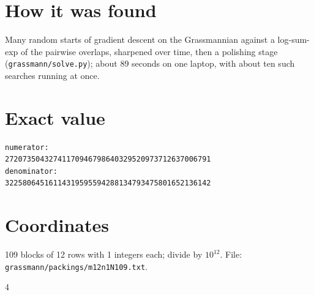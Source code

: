 \documentclass[11pt,a4paper]{article}
\begin{document}
\section{How it was found}
Many random starts of gradient descent on the Grassmannian against a log-sum-exp of the pairwise overlaps, sharpened over time, then a polishing stage (\texttt{grassmann/solve.py}); about 89 seconds on one laptop, with about ten such searches running at once.


\appendix
\section{Exact value}
{\small
\begin{verbatim}
numerator:
27207350432741170946798640329520973712637006791
denominator:
32258064516114319595594288134793475801652136142
\end{verbatim}}

\section{Coordinates}
109 blocks of 12 rows with 1 integers each; divide by $10^{12}$. File: \texttt{grassmann/packings/m12n1N109.txt}.
{\tiny
\begin{multicols}{4}
\end{multicols}}
\end{document}
